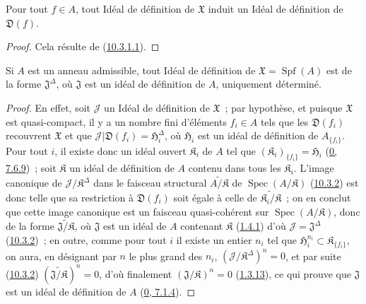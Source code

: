 \begin{proposition}[10.3.4]
\label{I.10.3.4-fr}
Pour tout $f\in A$, tout Idéal de définition de $\mathfrak{X}$ induit un
Idéal de définition de $\mathfrak{D}(f)$.
\end{proposition}

\begin{proof}
Cela résulte de (\hyperref[I.10.3.1.1-fr]{10.3.1.1}).
\end{proof}

\begin{proposition}[10.3.5]
\label{I.10.3.5-fr}
Si $A$ est un anneau admissible, tout Idéal de définition de
$\mathfrak{X}=\operatorname{Spf}(A)$ est de la forme
$\mathfrak{J}^\Delta$, où $\mathfrak{J}$ est un idéal de définition de
$A$, uniquement déterminé.
\end{proposition}

\begin{proof}
En effet, soit $\mathscr{J}$ un Idéal de définition de $\mathfrak{X}$~;
par hypothèse, et puisque $\mathfrak{X}$ est quasi-compact, il y a un nombre
fini d'éléments $f_i\in A$ tels que les $\mathfrak{D}(f_i)$ recouvrent
$\mathfrak{X}$ et que
$\mathscr{J}|\mathfrak{D}(f_i)=\mathfrak{H}_i^\Delta$, où
$\mathfrak{H}_i$ est un idéal de définition de $A_{\{f_i\}}$. Pour tout
$i$, il existe donc un idéal ouvert $\mathfrak{K}_i$ de $A$ tel que
$(\mathfrak{K}_i)_{\{f_i\}}=\mathfrak{H}_i$
(\hyperref[0.7.6.9-fr]{0, 7.6.9})~; soit $\mathfrak{K}$ un idéal de
définition de $A$ contenu dans tous les $\mathfrak{K}_i$. L'image canonique
de $\mathscr{J}/\mathfrak{K}^\Delta$ dans le faisceau structural
$\widetilde{A/\mathfrak{K}}$ de
$\operatorname{Spec}(A/\mathfrak{K})$
(\hyperref[I.10.3.2-fr]{10.3.2}) est donc telle que sa restriction à
$\mathfrak{D}(f_i)$ soit égale à celle de
$\widetilde{\mathfrak{K}_i/\mathfrak{K}}$~; on en conclut que cette image
canonique est un faisceau quasi-cohérent sur
$\operatorname{Spec}(A/\mathfrak{K})$, donc de la forme
$\widetilde{\mathfrak{J}/\mathfrak{K}}$, où $\mathfrak{J}$ est un idéal de
$A$ contenant $\mathfrak{K}$ (\hyperref[I.1.4.1-fr]{1.4.1}) d'où
$\mathscr{J}=\mathfrak{J}^\Delta$
(\hyperref[I.10.3.2-fr]{10.3.2})~; en outre, comme pour tout $i$ il existe
un entier $n_i$ tel que
$\mathfrak{H}_i^{n_i}\subset\mathfrak{K}_{\{f_i\}}$, on aura, en désignant
par $n$ le plus grand des $n_i$,
$(\mathscr{J}/\mathfrak{K}^\Delta)^n=0$, et par suite
(\hyperref[I.10.3.2-fr]{10.3.2})
$(\widetilde{\mathfrak{J}/\mathfrak{K}})^n=0$, d'où finalement
$(\mathfrak{J}/\mathfrak{K})^n=0$
(\hyperref[I.1.3.13-fr]{1.3.13}), ce qui prouve que $\mathfrak{J}$ est un
idéal de définition de $A$ (\hyperref[0.7.1.4-fr]{0, 7.1.4}).
\end{proof}

